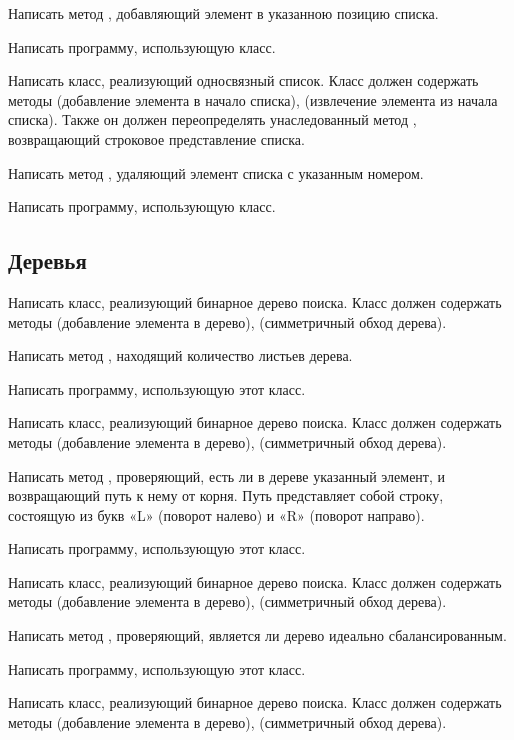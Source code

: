 Написать метод , добавляющий элемент в указанною позицию
списка.

Написать программу, использующую класс.

\task Написать класс, реализующий односвязный список. Класс должен
содержать методы  (добавление элемента в начало списка),
 (извлечение элемента из начала списка). Также он должен
переопределять унаследованный метод , возвращающий
строковое представление списка.

Написать метод , удаляющий элемент списка с указанным
номером.

Написать программу, использующую класс.


\subsection{Деревья}

\task Написать класс, реализующий бинарное дерево поиска. Класс должен
содержать методы  (добавление элемента в дерево),
 (симметричный обход дерева).

Написать метод , находящий количество листьев дерева.

Написать программу, использующую этот класс.

\task Написать класс, реализующий бинарное дерево поиска. Класс должен
содержать методы  (добавление элемента в дерево),
 (симметричный обход дерева).

Написать метод , проверяющий, есть ли в дереве указанный
элемент, и возвращающий путь к нему от корня. Путь представляет собой
строку, состоящую из букв «L» (поворот налево) и «R» (поворот
направо).

Написать программу, использующую этот класс.

\task Написать класс, реализующий бинарное дерево поиска. Класс должен
содержать методы  (добавление элемента в дерево),
 (симметричный обход дерева).

Написать метод , проверяющий, является ли дерево идеально сбалансированным.

Написать программу, использующую этот класс.

\task Написать класс, реализующий бинарное дерево поиска. Класс должен
содержать методы  (добавление элемента в дерево),
 (симметричный обход дерева).

